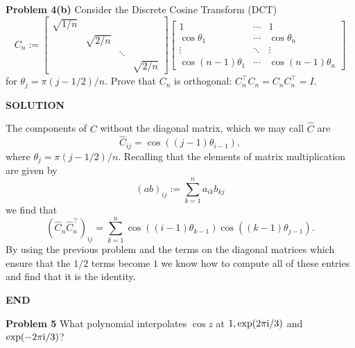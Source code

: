 \documentclass[12pt,a4paper]{article}
\begin{document}
\textbf{Problem 4(b)} Consider the Discrete Cosine Transform (DCT)
\[
C_n := \begin{bmatrix}
\sqrt{1/n} \\
 & \sqrt{2/n} \\
 && \ensuremath{\ddots} \\
 &&& \sqrt{2/n}
 \end{bmatrix}
\begin{bmatrix}
    1 & \ensuremath{\cdots} & 1\\
    \cos \ensuremath{\theta}_1 & \ensuremath{\cdots} & \cos \ensuremath{\theta}_n \\
    \ensuremath{\vdots} & \ensuremath{\ddots} & \ensuremath{\vdots} \\
    \cos (n-1)\ensuremath{\theta}_1 & \ensuremath{\cdots} & \cos (n-1)\ensuremath{\theta}_n
\end{bmatrix}
\]
for $\ensuremath{\theta}_j = \ensuremath{\pi}(j-1/2)/n$. Prove that $C_n$ is orthogonal: $C_n^\ensuremath{\top} C_n = C_n C_n^\ensuremath{\top} = I$.

\textbf{SOLUTION}

The components of $C$ without the diagonal matrix, which we may call $\hat{C}$ are
\[
\hat{C}_{ij} = \cos((j-1)\ensuremath{\theta}_{i-1}),
\]
where $\ensuremath{\theta}_j = \ensuremath{\pi}(j-1/2)/n$. Recalling that the elements of matrix multiplication are given by
\[
(ab)_{ij} := \ensuremath{\sum}_{k=1}^n a_{ik} b_{kj}
\]
we find that
\[
(\hat{C}_n \hat{C}_n^\ensuremath{\top})_{ij} = \ensuremath{\sum}_{k=1}^n \cos((i-1)\ensuremath{\theta}_{k-1}) \cos((k-1)\ensuremath{\theta}_{j-1}).
\]
By using the previous problem and the terms on the diagonal matrices which ensure that the $1/2$ terms become $1$ we know how to compute all of these entries and find that it is the identity.

\textbf{END}

\textbf{Problem 5} What polynomial interpolates $\cos z$ at $1, \exp(2\pi{\rm i}/3)$ and $\exp(-2\pi{\rm i}/3)$?
\end{document}
